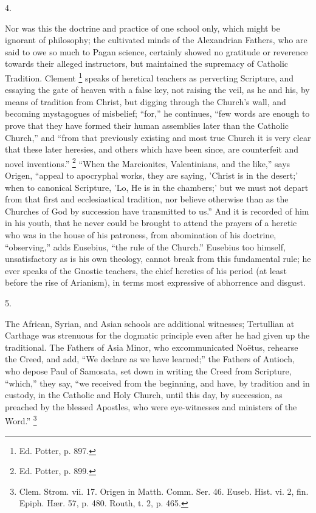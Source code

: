 4.

Nor was this the doctrine and practice of one school only, which
might be ignorant of philosophy; the cultivated minds of the
Alexandrian Fathers, who are said to owe so much to Pagan science,
certainly showed no gratitude or reverence towards their alleged
instructors, but maintained the supremacy of Catholic Tradition.
Clement \footnote{Ed. Potter, p. 897.} speaks of
heretical teachers as perverting Scripture, and essaying the gate of
heaven with a false key, not raising the veil, as he and his, by means
of tradition from Christ, but digging through the Church's wall, and
becoming mystagogues of misbelief; ``for,'' he continues,
``few words are enough to prove that they have formed their human
assemblies later than the Catholic Church,'' and ``from that
previously existing and most true Church it is very clear that these
later heresies, and others which have been since, are counterfeit and
novel inventions.'' \footnote{Ed. Potter, p. 899.}
``When the Marcionites, Valentinians, and the like,'' says Origen,
``appeal to apocryphal works, they are saying, 'Christ is in the
desert;' when to canonical Scripture, 'Lo, He is in the chambers;' but
we must not depart from that first and ecclesiastical tradition, nor
believe otherwise than as the Churches of God by succession have
transmitted to us.'' And it is recorded of him in his youth, that
he never could be brought to attend the prayers of a heretic who was
in the house of his patroness, from abomination of his doctrine,
``observing,'' adds Eusebius, ``the rule of the
Church.'' Eusebius too himself, unsatisfactory as is his own
theology, cannot break from this fundamental rule; he ever speaks of
the Gnostic teachers, the chief heretics of his period (at least
before the rise of Arianism), in terms most expressive of abhorrence
and disgust.

5.

The African, Syrian, and Asian schools are additional witnesses;
Tertullian at Carthage was strenuous for the dogmatic principle even
after he had given up the traditional. The Fathers of Asia Minor, who
excommunicated Noëtus, rehearse the Creed, and add, ``We declare
as we have learned;'' the Fathers of Antioch, who depose Paul of
Samosata, set down in writing the Creed from Scripture,
``which,'' they say, ``we received from the beginning, and
have, by tradition and in custody, in the Catholic and Holy Church,
until this day, by succession, as preached by the blessed Apostles,
who were eye-witnesses and ministers of the Word.'' \footnote{Clem. Strom. vii. 17. Origen in Matth.
Comm. Ser. 46. Euseb. Hist. vi. 2, fin. Epiph. Hær. 57, p. 480. Routh,
t. 2, p. 465.}

